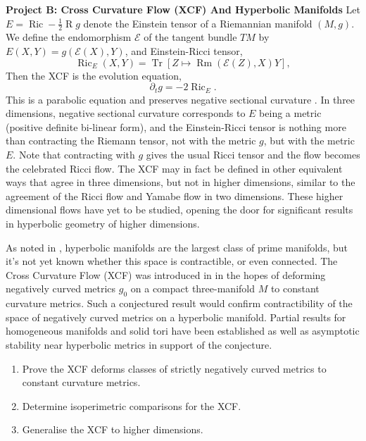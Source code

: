 \documentclass[12pt]{amsart}
\begin{document}
\noindent\textbf{Project B: Cross Curvature Flow (XCF) And Hyperbolic Manifolds}
\label{sec:orgheadline3}
Let \(E = \operatorname{Ric} - \tfrac{1}{2} \operatorname{R} g\) denote the Einstein tensor of a Riemannian manifold \((M, g)\). We define the endomorphism \(\mathcal{E}\) of the tangent bundle \(TM\) by \(E(X, Y) = g(\mathcal{E}(X), Y)\), and Einstein-Ricci tensor,
\[
\operatorname{Ric}_E (X, Y) = \operatorname{Tr} \left[Z \mapsto \operatorname{Rm} (\mathcal{E}(Z), X) Y\right],
\]
Then the XCF is the evolution equation,
\[
\partial_t g = -2 \operatorname{Ric}_E.
\]
This is a parabolic equation and preserves negative sectional curvature \cite{MR2055396,MR2207496}. In three dimensions, negative sectional curvature corresponds to \(E\) being a metric (positive definite bi-linear form), and the Einstein-Ricci tensor is nothing more than contracting the Riemann tensor, not with the metric \(g\), but with the metric \(E\). Note that contracting with \(g\) gives the usual Ricci tensor and the flow becomes the celebrated Ricci flow. The XCF may in fact be defined in other equivalent ways that agree in three dimensions, but not in higher dimensions, similar to the agreement of the Ricci flow and Yamabe flow in two dimensions. These higher dimensional flows have yet to be studied, opening the door for significant results in hyperbolic geometry of higher dimensions.

As noted in \cite{MR2602839}, hyperbolic manifolds are the largest class of prime manifolds, but it's not yet known whether this space is contractible, or even connected. The Cross Curvature Flow (XCF) was introduced in \cite{MR2055396} in the hopes of deforming negatively curved metrics \(g_0\) on a compact three-manifold \(M\) to constant curvature metrics. Such a conjectured result would confirm contractibility of the space of negatively curved metrics on a hyperbolic manifold. Partial results for homogeneous manifolds and solid tori have been established \cite{MR2407107,MR2653711,MR2602839} as well as asymptotic stability near hyperbolic metrics \cite{MR2448593} in support of the conjecture.

\begin{enumerate}[label=\textbf{(B.\arabic*)}]
\item Prove the XCF deforms classes of strictly negatively curved metrics to constant curvature metrics.
\item Determine isoperimetric comparisons for the XCF.
\item Generalise the XCF to higher dimensions.
\end{enumerate}
\end{document}
